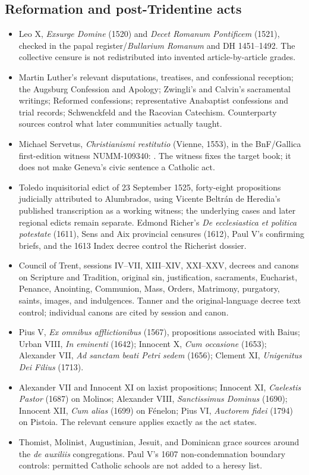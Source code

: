 \subsection{Reformation and post-Tridentine acts}

\begin{itemize}
  \item Leo X, \emph{Exsurge Domine} (1520) and \emph{Decet Romanum Pontificem} (1521), checked in the papal register/\emph{Bullarium Romanum} and DH 1451--1492. The collective censure is not redistributed into invented article-by-article grades.
  \item Martin Luther's relevant disputations, treatises, and confessional reception; the Augsburg Confession and Apology; Zwingli's and Calvin's sacramental writings; Reformed confessions; representative Anabaptist confessions and trial records; Schwenckfeld and the Racovian Catechism. Counterparty sources control what later communities actually taught.
  \item Michael Servetus, \emph{Christianismi restitutio} (Vienne, 1553), in the BnF/Gallica first-edition witness NUMM-109340: . The witness fixes the target book; it does not make Geneva's civic sentence a Catholic act.
  \item Toledo inquisitorial edict of 23 September 1525, forty-eight propositions judicially attributed to Alumbrados, using Vicente Beltr\'an de Heredia's published transcription as a working witness; the underlying cases and later regional edicts remain separate. Edmond Richer's \emph{De ecclesiastica et politica potestate} (1611), Sens and Aix provincial censures (1612), Paul V's confirming briefs, and the 1613 Index decree control the Richerist dossier.
  \item Council of Trent, sessions IV--VII, XIII--XIV, XXI--XXV, decrees and canons on Scripture and Tradition, original sin, justification, sacraments, Eucharist, Penance, Anointing, Communion, Mass, Orders, Matrimony, purgatory, saints, images, and indulgences. Tanner and the original-language decree text control; individual canons are cited by session and canon.
  \item Pius V, \emph{Ex omnibus afflictionibus} (1567), propositions associated with Baius; Urban VIII, \emph{In eminenti} (1642); Innocent X, \emph{Cum occasione} (1653); Alexander VII, \emph{Ad sanctam beati Petri sedem} (1656); Clement XI, \emph{Unigenitus Dei Filius} (1713).
  \item Alexander VII and Innocent XI on laxist propositions; Innocent XI, \emph{Caelestis Pastor} (1687) on Molinos; Alexander VIII, \emph{Sanctissimus Dominus} (1690); Innocent XII, \emph{Cum alias} (1699) on F\'enelon; Pius VI, \emph{Auctorem fidei} (1794) on Pistoia. The relevant censure applies exactly as the act states.
  \item Thomist, Molinist, Augustinian, Jesuit, and Dominican grace sources around the \emph{de auxiliis} congregations. Paul V's 1607 non-condemnation boundary controls: permitted Catholic schools are not added to a heresy list.
\end{itemize}

